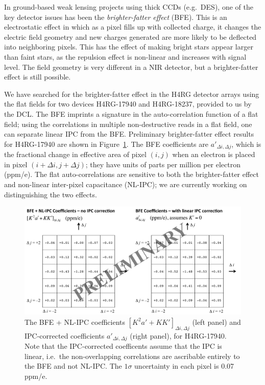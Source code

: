In ground-based weak lensing projects using thick CCDs (e.g.\ DES), one of the
key detector issues has been the {\em brighter-fatter effect} (BFE). This is an
electrostatic effect in which as a pixel fills up with collected charge, it
changes the electric field geometry and new charges generated are more likely to
be deflected into neighboring pixels. This has the effect of making bright stars
appear larger than faint stars, as the repulsion effect is non-linear and
increases with signal level. The field geometry is very different in a NIR
detector, but a brighter-fatter effect is still possible.

We have searched for the brighter-fatter effect in the H4RG detector arrays
using the flat fields for two devices H4RG-17940 and H4RG-18237, provided to us
by the DCL. The BFE imprints a signature in the auto-correlation function of a
flat field; using the correlations in multiple non-destructive reads in a flat
field, one can separate linear IPC from the BFE. Preliminary brighter-fatter
effect results for H4RG-17940 are shown in Figure~\ref{fig:kernel}. The BFE
coefficients are $a'_{\Delta i,\Delta j}$, which is the fractional change in
effective area of pixel $(i,j)$ when an electron is placed in pixel $(i+\Delta
i, j+\Delta j)$; they have units of parts per million per electron (ppm/e). The
flat auto-correlations are sensitive to both the brighter-fatter effect and
non-linear inter-pixel capacitance (NL-IPC); we are currently working on
distinguishing the two effects.

\begin{figure}[!t]
  \includegraphics[width=6.2in]{Plots/kernel-17940B.pdf}
\caption{\label{fig:kernel}The BFE + NL-IPC coefficients $[K^2a'+KK']_{\Delta
i,\Delta j}$ (left panel) and IPC-corrected coefficients $a'_{\Delta i,\Delta
j}$ (right panel), for H4RG-17940. Note that the IPC-corrected coefficents
assume that the IPC is linear, i.e.\ the non-overlapping correlations are
ascribable entirely to the BFE and not NL-IPC. The $1\sigma$ uncertainty in each
pixel is 0.07 ppm/e.}
\end{figure}

